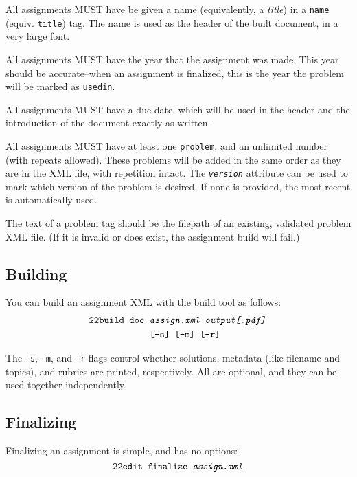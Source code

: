     All assignments MUST have be given a name (equivalently, a \textit{title})
    in a \texttt{name} (equiv. \texttt{title}) tag. The name is used as the 
    header of the built document, in a very large font.
    
    All assignments MUST have the year that the assignment was made. This 
    year should be accurate--when an assignment is finalized, this is the 
    year the problem will be marked as \texttt{usedin}.
    
    All assignments MUST have a due date, which will be used in the header 
    and the introduction of the document exactly as written. 
    
    All assignments MUST have at least one \texttt{problem}, and an 
    unlimited number (with repeats allowed). These problems will be added in 
    the same order as they are in the XML file, with repetition intact. The 
    \texttt{\textit{version}} attribute can be used to mark which version of 
    the problem is desired. If none is provided, the most recent is 
    automatically used.
    
    The text of a problem tag should be the filepath of an existing, 
    validated problem XML file. (If it is invalid or does exist, the 
    assignment build will fail.)
    
  \subsection{Building}
    You can build an assignment XML with the build tool as follows: 
    \begin{align*}
      \texttt{22build }\texttt{doc }&\texttt{\textit{assign.xml output[.pdf]}}\\
      ~&\texttt{[-s] [-m] [-r]}
    \end{align*}
    
    The \texttt{-s}, \texttt{-m}, and \texttt{-r} flags control whether 
    solutions, metadata (like filename and topics), and rubrics are printed, 
    respectively. All are optional, and they can be used together independently.
    
  \subsection{Finalizing}
    Finalizing an assignment is simple, and has no options:
    \[\texttt{22edit }\texttt{finalize \textit{assign.xml}}\]